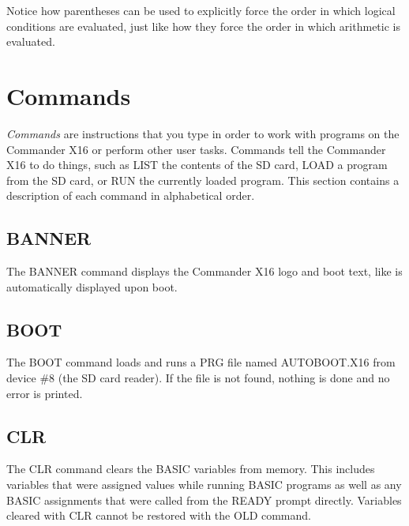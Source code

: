 
Notice how parentheses can be used to explicitly force the order in which
logical conditions are evaluated, just like how they force the order in which
arithmetic is evaluated.\\

\section{Commands}

\emph{Commands} are instructions that you type in order to work with programs
on the Commander X16 or perform other user tasks.  Commands tell the Commander
X16 to do things, such as {\ttfamily LIST} the contents of the SD card,
{\ttfamily LOAD} a program from the SD card, or {\ttfamily RUN} the currently
loaded program.  This section contains a description of each command in
alphabetical order.\\

\subsection{BANNER}

The {\ttfamily BANNER} command displays the Commander X16 logo and boot text,
like is automatically displayed upon boot.

\subsection{BOOT}

The {\ttfamily BOOT} command loads and runs a PRG file named {\ttfamily
AUTOBOOT.X16} from device \#8 (the SD card reader). If the file is not found,
nothing is done and no error is printed.\\

\subsection{CLR}

The {\ttfamily CLR} command clears the BASIC variables from memory.  This
includes variables that were assigned values while running BASIC programs as
well as any BASIC assignments that were called from the {\ttfamily READY}
prompt directly.  Variables cleared with {\ttfamily CLR} cannot be restored
with the {\ttfamily OLD} command.

